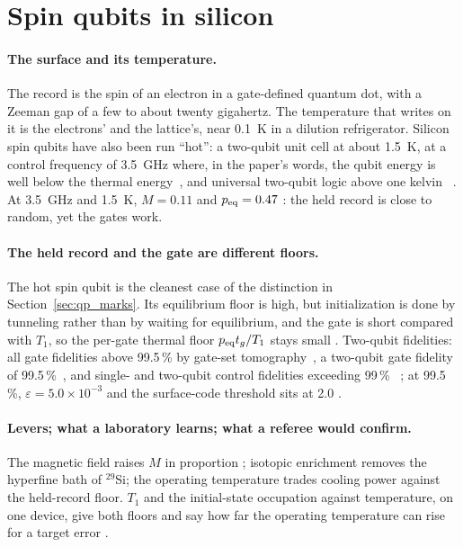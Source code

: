 \section{Spin qubits in silicon}\label{sec:qp_si}
\paragraph{The surface and its temperature.} The record is the spin of an electron in a gate-defined quantum dot, with a Zeeman gap of a few
to about twenty gigahertz. The temperature that writes on it is the electrons' and the lattice's, near 0.1~K in a dilution refrigerator.
Silicon spin qubits have also been run ``hot'': a two-qubit unit cell at about 1.5~K, at a control frequency of 3.5~GHz where, in the paper's
words, the qubit energy is well below the thermal energy~\cite{Yang2020hot}, and universal two-qubit logic above one kelvin~\cite{Petit2020hot}
\observed. At 3.5~GHz and 1.5~K, $M=0.11$ and $p_{\rm eq}=0.47$ \calc: the held record is close to random, yet the gates work.

\paragraph{The held record and the gate are different floors.} The hot spin qubit is the cleanest case of the distinction in
Section~\ref{sec:qp_marks}. Its equilibrium floor is high, but initialization is done by tunneling rather than by waiting for equilibrium,
and the gate is short compared with $T_1$, so the per-gate thermal floor $p_{\rm eq}t_g/T_1$ stays small \derived. Two-qubit fidelities: all
gate fidelities above 99.5\,\% by gate-set tomography~\cite{Xue2022}, a two-qubit gate fidelity of 99.5\,\%~\cite{Noiri2022}, and single- and
two-qubit control fidelities exceeding 99\,\%~\cite{Mills2022} \observed; at 99.5\,\%, $\varepsilon=5.0\times10^{-3}$ and the surface-code
threshold sits at 2.0 \calc.

\paragraph{Levers; what a laboratory learns; what a referee would confirm.} The magnetic field raises $M$ in proportion \derived; isotopic enrichment
removes the hyperfine bath of $^{29}$Si; the operating temperature trades cooling power against the held-record floor. $T_1$ and the
initial-state occupation against temperature, on one device, give both floors and say how far the operating temperature can rise for a
target error \interp.

